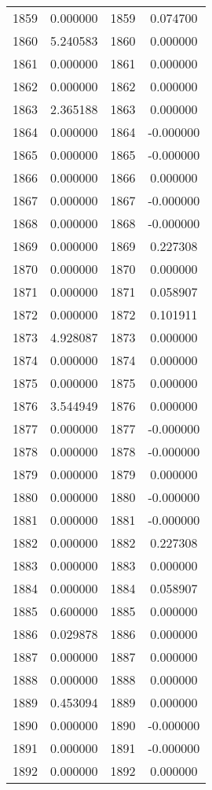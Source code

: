 \documentclass[12pt]{article}
\begin{document}
\begin{longtable}{@{}cccc@{}}
1859 & 0.000000 & 1859 & 0.074700 \\
1860 & 5.240583 & 1860 & 0.000000 \\
1861 & 0.000000 & 1861 & 0.000000 \\
1862 & 0.000000 & 1862 & 0.000000 \\
1863 & 2.365188 & 1863 & 0.000000 \\
1864 & 0.000000 & 1864 & -0.000000 \\
1865 & 0.000000 & 1865 & -0.000000 \\
1866 & 0.000000 & 1866 & 0.000000 \\
1867 & 0.000000 & 1867 & -0.000000 \\
1868 & 0.000000 & 1868 & -0.000000 \\
1869 & 0.000000 & 1869 & 0.227308 \\
1870 & 0.000000 & 1870 & 0.000000 \\
1871 & 0.000000 & 1871 & 0.058907 \\
1872 & 0.000000 & 1872 & 0.101911 \\
1873 & 4.928087 & 1873 & 0.000000 \\
1874 & 0.000000 & 1874 & 0.000000 \\
1875 & 0.000000 & 1875 & 0.000000 \\
1876 & 3.544949 & 1876 & 0.000000 \\
1877 & 0.000000 & 1877 & -0.000000 \\
1878 & 0.000000 & 1878 & -0.000000 \\
1879 & 0.000000 & 1879 & 0.000000 \\
1880 & 0.000000 & 1880 & -0.000000 \\
1881 & 0.000000 & 1881 & -0.000000 \\
1882 & 0.000000 & 1882 & 0.227308 \\
1883 & 0.000000 & 1883 & 0.000000 \\
1884 & 0.000000 & 1884 & 0.058907 \\
1885 & 0.600000 & 1885 & 0.000000 \\
1886 & 0.029878 & 1886 & 0.000000 \\
1887 & 0.000000 & 1887 & 0.000000 \\
1888 & 0.000000 & 1888 & 0.000000 \\
1889 & 0.453094 & 1889 & 0.000000 \\
1890 & 0.000000 & 1890 & -0.000000 \\
1891 & 0.000000 & 1891 & -0.000000 \\
1892 & 0.000000 & 1892 & 0.000000 \\

\end{longtable}
\end{document}
